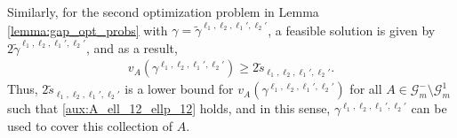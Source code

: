 \documentclass[aap,preprint]{imsart}
\newcommand{\Mstar}{[m]}
\theoremstyle{plain}
\theoremstyle{definition}
\begin{document}

Similarly, for the second optimization problem in Lemma \ref{lemma:gap_opt_probs} with $\gamma = \tilde{\gamma}^{\ell_1,\ell_2,\ell_1',\ell_2'}$, a feasible solution is given by $ 2 \tilde{\gamma}^{\ell_1,\ell_2, \ell_1',\ell_2'}$, and as a result,
\begin{align}
    \label{aux:gap_lower_bound_12_prime}
    v_A(\gamma^{\ell_1,\ell_2,\ell_1',\ell_2'}) \geq 2\tilde{s}_{\ell_1,\ell_2,\ell_1',\ell_2'}.
\end{align}
Thus, $2\tilde{s}_{\ell_1,\ell_2,\ell_1',\ell_2'}$ is a lower bound for $v_A(\gamma^{\ell_1,\ell_2,\ell_1',\ell_2'})$ for all $A \in \mathcal{G}_m^{-} \setminus \mathcal{G}_m^{1}$ such that \eqref{aux:A_ell_12_ellp_12} holds, and in this sense, $\gamma^{\ell_1,\ell_2,\ell_1',\ell_2'}$ can be used to cover this collection of $A$.


\end{document}

